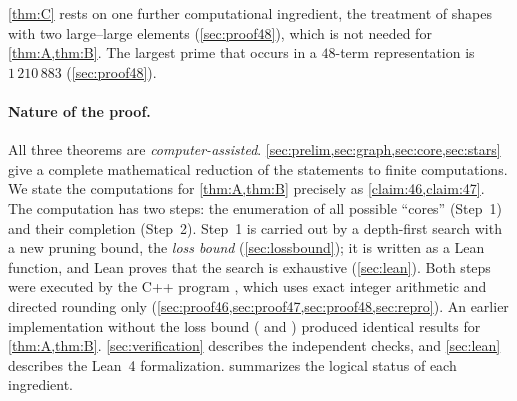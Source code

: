 \documentclass[11pt]{article}
\begin{document}
\cref{thm:C} rests on one further computational ingredient, the treatment of shapes with two large--large elements (\cref{sec:proof48}), which is not needed for \cref{thm:A,thm:B}. The largest prime that occurs in a $48$-term representation is $1\,210\,883$ (\cref{sec:proof48}).

\paragraph{Nature of the proof.}
All three theorems are \emph{computer-assisted}.
\cref{sec:prelim,sec:graph,sec:core,sec:stars} give a complete mathematical reduction of the statements to finite computations.
We state the computations for \cref{thm:A,thm:B} precisely as \cref{claim:46,claim:47}.
The computation has two steps: the enumeration of all possible ``cores'' (Step~1) and their completion (Step~2).
Step~1 is carried out by a depth-first search with a new pruning bound, the \emph{loss bound} (\cref{sec:lossbound}); it is written as a Lean function, and Lean proves that the search is exhaustive (\cref{sec:lean}).
Both steps were executed by the C++ program , which uses exact integer arithmetic and directed rounding only (\cref{sec:proof46,sec:proof47,sec:proof48,sec:repro}).
An earlier implementation without the loss bound ( and ) produced identical results for \cref{thm:A,thm:B}.
\cref{sec:verification} describes the independent checks, and \cref{sec:lean} describes the Lean~4 formalization.
 summarizes the logical status of each ingredient.
\end{document}
